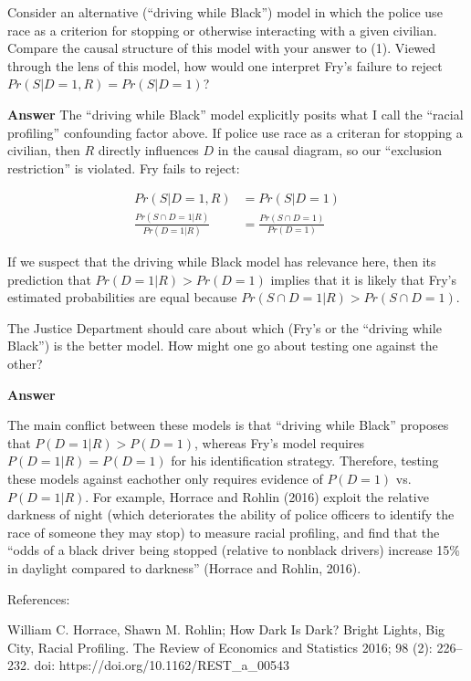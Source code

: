 \documentclass[11pt]{exam}
\begin{document}
\begin{questions}
    \question Consider an alternative (``driving while Black'') model in
which the police use race as a criterion for stopping or otherwise
interacting with a given civilian. Compare the causal structure of this
model with your answer to (1). Viewed through the lens of this model,
how would one interpret Fry's failure to reject
\(Pr(S|D = 1, R) = Pr(S|D = 1)\)?

\textbf{Answer} The ``driving while Black'' model explicitly posits what
I call the ``racial profiling'' confounding factor above. If police use
race as a criteran for stopping a civilian, then \(R\) directly
influences \(D\) in the causal diagram, so our ``exclusion restriction''
is violated. Fry fails to reject:

\begin{align*} Pr(S|D = 1, R) &= Pr(S|D = 1) \\ \frac{Pr(S\cap D = 1|R)}{Pr(D=1|R)} &= \frac{Pr(S\cap D = 1)}{Pr(D=1)} \end{align*}

If we suspect that the driving while Black model has relevance here,
then its prediction that \(Pr(D=1|R) > Pr(D=1)\) implies that it is
likely that Fry's estimated probabilities are equal because
\(Pr(S\cap D = 1|R) > Pr(S\cap D = 1)\).

    \question The Justice Department should care about which (Fry's or
the ``driving while Black'') is the better model. How might one go about
testing one against the other?

\textbf{Answer}

The main conflict between these models is that ``driving while Black''
proposes that \(P(D = 1 | R) > P(D = 1)\), whereas Fry's model requires
\(P(D = 1 | R)= P(D = 1)\) for his identification strategy. Therefore,
testing these models against eachother only requires evidence of
\(P(D=1)\) vs.~\(P(D=1|R)\). For example, Horrace and Rohlin (2016)
exploit the relative darkness of night (which deteriorates the ability of
police officers to identify the race of someone they may stop) to
measure racial profiling, and find that the ``odds of a black driver
being stopped (relative to nonblack drivers) increase 15\% in daylight
compared to darkness'' (Horrace and Rohlin, 2016).

References:

William C. Horrace, Shawn M. Rohlin; How Dark Is Dark? Bright Lights,
Big City, Racial Profiling. The Review of Economics and Statistics 2016;
98 (2): 226--232. doi: https://doi.org/10.1162/REST\_a\_00543

\end{questions}
\end{document}
